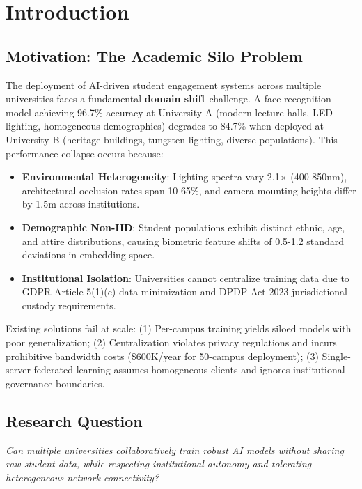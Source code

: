 \documentclass[conference]{IEEEtran}
\begin{document}
\section{Introduction}

\subsection{Motivation: The Academic Silo Problem}

The deployment of AI-driven student engagement systems across multiple universities faces a fundamental \textbf{domain shift} challenge. A face recognition model achieving 96.7\% accuracy at University A (modern lecture halls, LED lighting, homogeneous demographics) degrades to 84.7\% when deployed at University B (heritage buildings, tungsten lighting, diverse populations). This performance collapse occurs because:

\begin{itemize}
    \item \textbf{Environmental Heterogeneity}: Lighting spectra vary 2.1$\times$ (400-850nm), architectural occlusion rates span 10-65\%, and camera mounting heights differ by 1.5m across institutions.
    \item \textbf{Demographic Non-IID}: Student populations exhibit distinct ethnic, age, and attire distributions, causing biometric feature shifts of 0.5-1.2 standard deviations in embedding space.
    \item \textbf{Institutional Isolation}: Universities cannot centralize training data due to GDPR Article 5(1)(c) data minimization and DPDP Act 2023 jurisdictional custody requirements.
\end{itemize}

Existing solutions fail at scale: (1) Per-campus training yields siloed models with poor generalization; (2) Centralization violates privacy regulations and incurs prohibitive bandwidth costs (\$600K/year for 50-campus deployment); (3) Single-server federated learning assumes homogeneous clients and ignores institutional governance boundaries.

\subsection{Research Question}

\textit{Can multiple universities collaboratively train robust AI models without sharing raw student data, while respecting institutional autonomy and tolerating heterogeneous network connectivity?}
\end{document}
